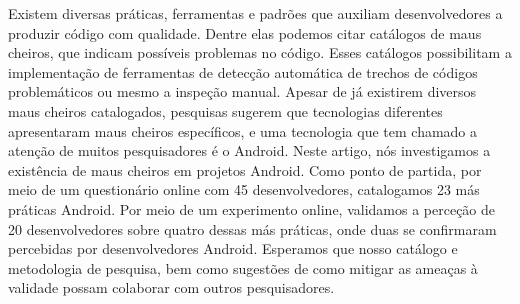 Existem diversas práticas, ferramentas e padrões que auxiliam desenvolvedores a produzir código com qualidade. Dentre elas podemos citar catálogos de maus cheiros, que indicam possíveis problemas no código. Esses catálogos possibilitam a implementação de ferramentas de detecção automática de trechos de códigos problemáticos ou mesmo a inspeção manual. Apesar de já existirem diversos maus cheiros catalogados, pesquisas sugerem que tecnologias diferentes apresentaram maus cheiros específicos, e uma tecnologia que tem chamado a atenção de muitos pesquisadores é o Android. Neste artigo, nós investigamos a existência de maus cheiros em projetos Android. Como ponto de partida, por meio de um questionário online com 45 desenvolvedores, catalogamos 23 más práticas Android. Por meio de um experimento online, validamos a perceção de 20 desenvolvedores sobre quatro dessas más práticas, onde duas se confirmaram percebidas por desenvolvedores Android. Esperamos que nosso catálogo e metodologia de pesquisa, bem como sugestões de como mitigar as ameaças à validade possam colaborar com outros pesquisadores.


